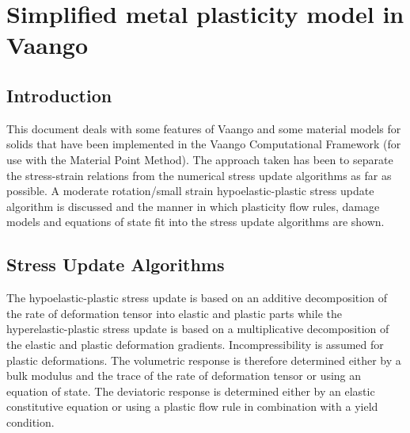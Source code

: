 
%

\chapter{Simplified metal plasticity model in Vaango}

\section{Introduction}
This document deals with some features of Vaango and some material models 
for solids that have been implemented in the Vaango Computational Framework 
(for use with the Material Point Method).  The approach taken has been to 
separate the stress-strain relations from the numerical stress update 
algorithms as far as possible.  A moderate rotation/small strain 
hypoelastic-plastic stress update algorithm is discussed and the manner in 
which plasticity flow rules, damage models and equations of state
fit into the stress update algorithms are shown.

\section{Stress Update Algorithms}
The hypoelastic-plastic stress update is based on an additive
decomposition of the rate of deformation tensor into elastic
and plastic parts while the hyperelastic-plastic stress update
is based on a multiplicative decomposition of the elastic and 
plastic deformation gradients.  Incompressibility is assumed
for plastic deformations.  The volumetric response is therefore
determined either by a bulk modulus and the trace of the rate
of deformation tensor or using an equation of state.  The 
deviatoric response is determined either by an elastic constitutive 
equation or using a plastic flow rule in combination with a 
yield condition. 
  
